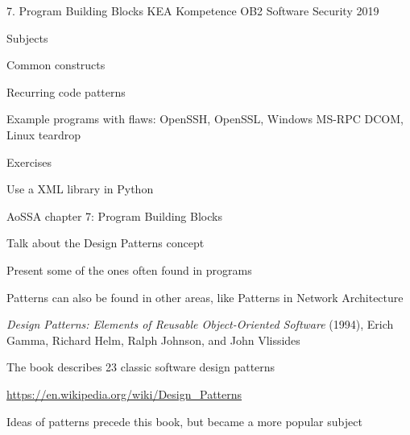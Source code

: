 \documentclass[Screen16to9,17pt]{foils}
\begin{document}
\mytitlepage
{7. Program Building Blocks}
{KEA Kompetence OB2 Software Security 2019}


\begin{list1}
\item Subjects
\begin{list2}
\item Common constructs
\item Recurring code patterns
\item Example programs with flaws: OpenSSH, OpenSSL, Windows MS-RPC DCOM, Linux teardrop
\end{list2}
\item Exercises
\begin{list2}
\item Use a XML library in Python
\end{list2}
\end{list1}


\begin{list1}
\item AoSSA chapter 7: Program Building Blocks
\end{list1}



\begin{list1}
\item Talk about the Design Patterns concept
\item Present some of the ones often found in programs
\item Patterns can also be found in other areas, like Patterns in Network Architecture
\end{list1}


\begin{list2}
\item \emph{Design Patterns: Elements of Reusable Object-Oriented Software} (1994), Erich Gamma, Richard Helm, Ralph Johnson, and John Vlissides

\item The book describes 23 classic software design patterns

\item \url{https://en.wikipedia.org/wiki/Design_Patterns}

\item Ideas of patterns precede this book, but became a more popular subject
\end{list2}
\end{document}
